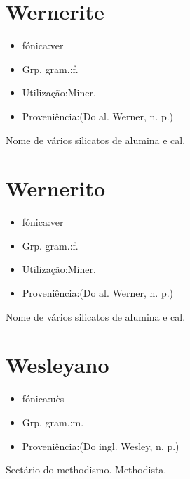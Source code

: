 \documentclass{article}
\begin{document}
\section{Wernerite}
\begin{itemize}
\item {fónica:ver}
\end{itemize}
\begin{itemize}
\item {Grp. gram.:f.}
\end{itemize}
\begin{itemize}
\item {Utilização:Miner.}
\end{itemize}
\begin{itemize}
\item {Proveniência:(Do al. \textunderscore Werner\textunderscore , n. p.)}
\end{itemize}
Nome de vários silicatos de alumina e cal.
\section{Wernerito}
\begin{itemize}
\item {fónica:ver}
\end{itemize}
\begin{itemize}
\item {Grp. gram.:f.}
\end{itemize}
\begin{itemize}
\item {Utilização:Miner.}
\end{itemize}
\begin{itemize}
\item {Proveniência:(Do al. \textunderscore Werner\textunderscore , n. p.)}
\end{itemize}
Nome de vários silicatos de alumina e cal.
\section{Wesleyano}
\begin{itemize}
\item {fónica:uès}
\end{itemize}
\begin{itemize}
\item {Grp. gram.:m.}
\end{itemize}
\begin{itemize}
\item {Proveniência:(Do ingl. \textunderscore Wesley\textunderscore , n. p.)}
\end{itemize}
Sectário do methodismo.
Methodista.
\end{document}
